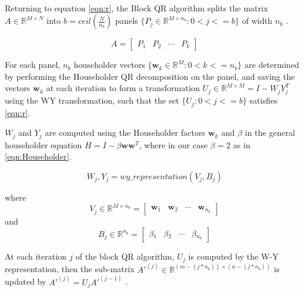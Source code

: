 \documentclass{article}
\begin{document}
\paragraph{}
Returning to equation \eqref{eqn:r}, the Block QR algorithm splits the matrix $A \in\mathbb{R}^{M\times{}N}$ into $b = ceil(\frac{N}{n_b})$ panels $\{P_j \in \mathbb{R}^{M\times{}n_b} : 0 < j <= b\}$ of width $n_b$ \cite{doi:10.1137/19M1296367}.

\begin{equation}
A = 
\begin{bmatrix}
P_1 & P_2 & \cdots & P_b
\end{bmatrix}
\end{equation}

For each panel, $n_b$ householder vectors $\{\mathbf{w}_k \in \mathbb{R}^M : 0 < k <= n_b\}$ are determined by performing the Householder QR decomposition on the panel, and saving the vectors $\mathbf{w}_k$ at each iteration to form a transformation $U_j \in \mathbb{R}^{M\times M} = I - W_jY_j^T$ using the WY transformation, such that the set $\{U_j : 0 < j <= b\}$ satisfies \eqref{eqn:r}.

$W_j$ and $Y_j$ are computed using the Householder factors $\mathbf{w}_k$ and $\beta{}$ in the general householder equation $H = I - \beta{}\mathbf{w}\mathbf{w}^T$, where in our case $\beta = 2$ as in \eqref{eqn:Householder}.

\begin{equation}
W_j, Y_j = wy\_representation(V_j, B_j)
\end{equation}

where 
\begin{equation}
V_j \in \mathbb{R}^{M \times n_b} =
\begin{bmatrix}
\mathbf{w}_1 & \mathbf{w}_2 & \cdots & \mathbf{w}_{n_b}
\end{bmatrix}
\end{equation}
and
\begin{equation}
B_j \in \mathbb{R}^{n_b} = 
\begin{bmatrix}
\beta{}_1 & \beta{}_2 & \cdots & \beta{}_{n_b}
\end{bmatrix}
\end{equation}

At each iteration $j$ of the block QR algorithm, $U_j$ is computed by the W-Y representation, then the sub-matrix $A'^{(j)} \in \mathbb{R}^{(m - (j * n_b)) \times (n - (j * n_b))}$ is updated by $A'^{(j)} = U_{j}A'^{(j-1)}$ \cite{doi:10.1137/19M1296367} \cite{golub}.
\end{document}
